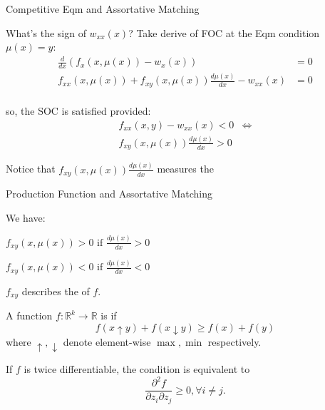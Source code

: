 \documentclass{beamer}%
\begin{document}
\begin{frame}{Competitive Eqm and Assortative Matching}
\begin{midi}
\item What's the sign of $w_{xx}(x)$? Take derive of FOC at the Eqm condition $\mu(x) = y$:
\begin{align*}
\frac{d}{dx} \left( f_x(x,\mu(x)) - w_x(x) \right) &= 0 \\
                f_{xx}(x,\mu(x)) + f_{xy}(x,\mu(x))\frac{d\mu(x)}{dx} - w_{xx}(x) &= 0 \\
\end{align*}
\item so, the SOC is satisfied provided:
\begin{align*}
f_{xx}(x,y) - w_{xx}(x) < 0 &\iff\\
f_{xy}(x,\mu(x))\frac{d\mu(x)}{dx} > 0 &
\end{align*}
\item Notice that $f_{xy}(x,\mu(x))\frac{d\mu(x)}{dx}$ measures the 
\end{midi}
\end{frame}

\begin{frame}{Production Function and Assortative Matching}
\begin{midi}
\item We have: 
\begin{mide}
\item {} $f_{xy}(x,\mu(x)) >0 \text{ if }\frac{d\mu(x)}{dx}>0$
\item {} $f_{xy}(x,\mu(x)) <0 \text{ if }\frac{d\mu(x)}{dx}<0$
\end{mide}
\pause
\item $f_{xy}$ describes the  of $f$.
\item A function $f: \mathbb{R}^k \to \mathbb{R}$ is  if
\begin{equation*}
f(x \uparrow y) + f(x \downarrow y) \geq f(x ) + f(y)
\end{equation*}
where $\uparrow,\downarrow$ denote element-wise $\max,\min$ respectively.
\item If $f$ is twice differentiable, the condition is equivalent to
\begin{equation*}
\frac{\partial^2 f}{\partial z_i\partial z_j} \geq 0,\forall i\neq j.
\end{equation*}
\end{midi}
\end{frame}
\end{document}
